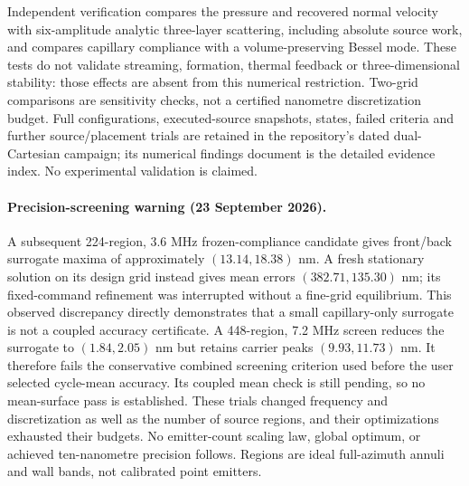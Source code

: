 Independent verification compares the pressure and recovered normal velocity
with six-amplitude analytic three-layer scattering, including absolute source
work, and compares capillary compliance with a volume-preserving Bessel mode.
These tests do not validate streaming, formation, thermal feedback or
three-dimensional stability: those effects are absent from this numerical
restriction. Two-grid comparisons are sensitivity checks, not a certified
nanometre discretization budget. Full configurations, executed-source snapshots,
states, failed criteria and further source/placement trials are retained in
the repository's dated dual-Cartesian campaign; its numerical findings document
is the detailed evidence index. No experimental validation is claimed.

\paragraph{Precision-screening warning (23 September 2026).}
A subsequent 224-region, 3.6 MHz frozen-compliance candidate gives front/back
surrogate maxima of approximately $(13.14,18.38)$ nm. A fresh stationary
solution on its design grid instead gives mean errors $(382.71,135.30)$ nm;
its fixed-command refinement was interrupted without a fine-grid equilibrium.
This observed discrepancy directly demonstrates that a small capillary-only
surrogate is not a coupled accuracy certificate. A 448-region, 7.2 MHz
screen reduces the surrogate to $(1.84,2.05)$ nm but retains carrier peaks
$(9.93,11.73)$ nm. It therefore fails the conservative combined screening
criterion used before the user selected cycle-mean accuracy. Its coupled mean
check is still pending, so no mean-surface pass is established. These trials changed
frequency and discretization as well as the number of source regions, and
their optimizations exhausted their budgets. No emitter-count scaling law,
global optimum, or achieved ten-nanometre precision follows. Regions are
ideal full-azimuth annuli and wall bands, not calibrated point emitters.

